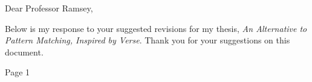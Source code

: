 \documentclass[manuscript,screen, 12pt, nonacm]{acmart}
\begin{document}
Dear Professor Ramsey, 

Below is my response to your suggested revisions for my thesis, \textit{An
Alternative to Pattern Matching, Inspired by Verse}. Thank you for your
suggestions on this document. 

{Page 1}
\end{document}
